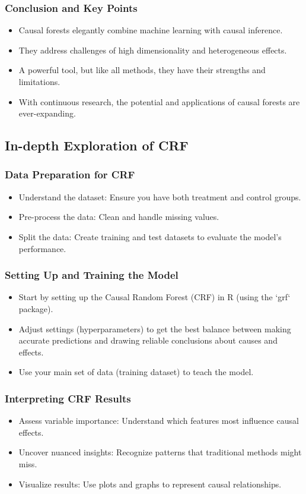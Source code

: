\documentclass{beamer}
\begin{document}
\begin{frame}
\frametitle{Conclusion and Key Points}
\begin{itemize}
    \item Causal forests elegantly combine machine learning with causal inference.
    \item They address challenges of high dimensionality and heterogeneous effects.
    \item A powerful tool, but like all methods, they have their strengths and limitations.
    \item With continuous research, the potential and applications of causal forests are ever-expanding.
\end{itemize}
\end{frame}




\subsection{In-depth Exploration of CRF}

\begin{frame}
\frametitle{Data Preparation for CRF}
\begin{itemize}
    \item Understand the dataset: Ensure you have both treatment and control groups.
    \item Pre-process the data: Clean and handle missing values.
    \item Split the data: Create training and test datasets to evaluate the model's performance.
\end{itemize}
\end{frame}

\begin{frame}
\frametitle{Setting Up and Training the Model}
\begin{itemize}
    \item Start by setting up the Causal Random Forest (CRF) in R (using the `grf` package).
    \item Adjust settings (hyperparameters) to get the best balance between making accurate predictions and drawing reliable conclusions about causes and effects.
    \item Use your main set of data (training dataset) to teach the model.
\end{itemize}
\end{frame}

\begin{frame}
\frametitle{Interpreting CRF Results}
\begin{itemize}
    \item Assess variable importance: Understand which features most influence causal effects.
    \item Uncover nuanced insights: Recognize patterns that traditional methods might miss.
    \item Visualize results: Use plots and graphs to represent causal relationships.
\end{itemize}
\end{frame}
\end{document}
